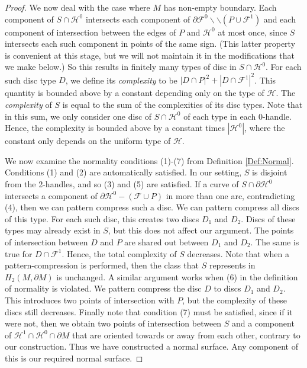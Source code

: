 \documentclass[oneside]{amsart}
\numberwithin{equation}{section}
\theoremstyle{plain}
\theoremstyle{definition}
\newcommand{\cut}{\backslash\backslash}
\newcommand{\calH}{\mathcal{H}}
\newcommand{\calF}{\mathcal{F}}
\begin{document}
\begin{proof}
We now deal with the case where $M$ has non-empty boundary. Each component of $S \cap \calH^0$ intersects each component of $\partial \calF^0 \cut (P \cup \calF^1)$ and each component of intersection between the edges of $P$ and $\calH^0$ at most once, since $S$ intersects each such component in points of the same sign. (This latter property is convenient at this stage, but we will not maintain it in the modifications that we make below.) So this results in finitely many types of disc in $S \cap \calH^0$. For each such disc type $D$, we define its \emph{complexity} to be $|D \cap P|^2 + |D \cap \calF^1|^2$. This quantity is bounded above by a constant depending only on the type of $\calH$. The \emph{complexity} of $S$ is equal to the sum of the complexities of its disc types. Note that in this sum, we only consider one disc of $S \cap \calH^0$ of each type in each 0-handle. Hence, the complexity is bounded above by a constant times $|\calH^0|$, where the constant only depends on the uniform type of $\calH$.

We now examine the normality conditions (1)-(7) from Definition \ref{Def:Normal}.  Conditions (1) and (2) are automatically satisfied. In our setting, $S$ is disjoint from the 2-handles, and so (3) and (5) are satisfied. If a curve of $S \cap \partial \calH^0$ intersects a component of $\partial \calH^0 - (\calF \cup P)$ in more than one arc, contradicting (4), then we can pattern compress such a disc. We can pattern compress all discs of this type. For each such disc, this creates two discs $D_1$ and $D_2$. Discs of these types may already exist in $S$, but this does not affect our argument. 
The points of intersection between $D$ and $P$ are shared out between $D_1$ and $D_2$. The same is true for $D \cap \calF^1$. Hence, the total complexity of $S$ decreases. Note that when a pattern-compression is performed, then the class that $S$ represents in $H_2(M, \partial M)$ is unchanged. A similar argument works when (6) in the definition of normality is violated. We pattern compress the disc $D$ to discs $D_1$ and $D_2$. This introduces two points of intersection with $P$, but the complexity of these discs still decreases. Finally note that condition (7) must be satisfied, since if it were not, then we obtain two points of intersection between $S$ and a component of $\calH^1 \cap \calH^0 \cap \partial M$ that are oriented towards or away from each other, contrary to our construction. Thus we have constructed a normal surface. Any component of this is our required normal surface.
\end{proof}
\end{document}
